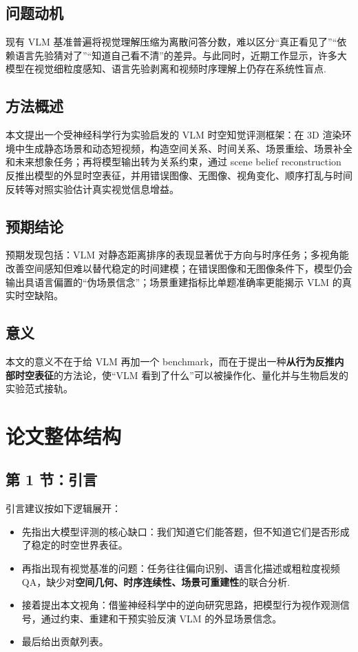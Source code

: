 \documentclass[UTF8,12pt,fontset=none]{ctexart}
\begin{document}
\subsection{问题动机}
现有 VLM 基准普遍将视觉理解压缩为离散问答分数，难以区分“真正看见了”“依赖语言先验猜对了”“知道自己看不清”的差异。与此同时，近期工作显示，许多大模型在视觉细粒度感知、语言先验剥离和视频时序理解上仍存在系统性盲点\cite{chen2024spatialvlm,fu2024blink,chen2024mmstar,lee2025vlind,fu2024videomme,zhou2024mlvu,liu2024tempcompass}.

\subsection{方法概述}
本文提出一个受神经科学行为实验启发的 VLM 时空知觉评测框架：在 3D 渲染环境中生成静态场景和动态短视频，构造空间关系、时间关系、场景重绘、场景补全和未来想象任务；再将模型输出转为关系约束，通过 scene belief reconstruction 反推出模型的外显时空表征，并用错误图像、无图像、视角变化、顺序打乱与时间反转等对照实验估计真实视觉信息增益。

\subsection{预期结论}
预期发现包括：VLM 对静态距离排序的表现显著优于方向与时序任务；多视角能改善空间感知但难以替代稳定的时间建模；在错误图像和无图像条件下，模型仍会输出具语言偏置的“伪场景信念”；场景重建指标比单题准确率更能揭示 VLM 的真实时空缺陷。

\subsection{意义}
本文的意义不在于给 VLM 再加一个 benchmark，而在于提出一种\textbf{从行为反推内部时空表征}的方法论，使“VLM 看到了什么”可以被操作化、量化并与生物启发的实验范式接轨。

\section{论文整体结构}

\subsection{第 1 节：引言}
引言建议按如下逻辑展开：
\begin{itemize}
  \item 先指出大模型评测的核心缺口：我们知道它们能答题，但不知道它们是否形成了稳定的时空世界表征。
  \item 再指出现有视觉基准的问题：任务往往偏向识别、语言化描述或粗粒度视频 QA，缺少对\textbf{空间几何、时序连续性、场景可重建性}的联合分析\cite{chen2024spatialvlm,fu2024blink,fu2024videomme,zhou2024mlvu,liu2024tempcompass,zhou2025vlm4d}.
  \item 接着提出本文视角：借鉴神经科学中的逆向研究思路，把模型行为视作观测信号，通过约束、重建和干预实验反演 VLM 的外显场景信念。
  \item 最后给出贡献列表。
\end{itemize}
\end{document}
